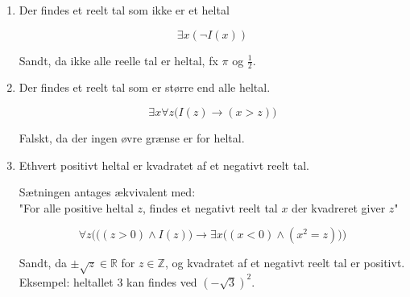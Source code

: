 \begin{enumerate}
    \item Der findes et reelt tal som ikke er et heltal
    
        \begin{equation*}
            \exists x(\neg I(x))
        \end{equation*}
        
        \begin{flushright}
            Sandt, da ikke alle reelle tal er heltal, fx $\pi$ og $\frac{1}{2}$.
        \end{flushright} 
    
    \item Der findes et reelt tal som er større end alle heltal.
    
        \begin{equation*}
            \exists x \forall z \big(I(z) \rightarrow \left( x>z\right)\big)
        \end{equation*}
        
        \begin{flushright}
            Falskt, da der ingen øvre grænse er for heltal.
        \end{flushright} 
        
        
    \item Ethvert positivt heltal er kvadratet af et negativt reelt tal.
    
    Sætningen antages ækvivalent med: \\ "For alle positive heltal $z$, findes et negativt reelt tal $x$ der kvadreret giver $z$"
    
    \begin{equation*}
            \forall z \Big(\big((z>0) \wedge I(z)\big) \rightarrow \exists x\big((x<0) \wedge (x^2 = z)\big)\Big)
        \end{equation*}
        
        \begin{flushright}
            Sandt, da $\pm\sqrt{z} \in \mathbb{R}$ for $z \in \mathbb{Z}$, og kvadratet af et negativt reelt tal er positivt. Eksempel: heltallet 3 kan findes ved $(- \sqrt{3})^2$.
        \end{flushright} 
        
        
\end{enumerate}